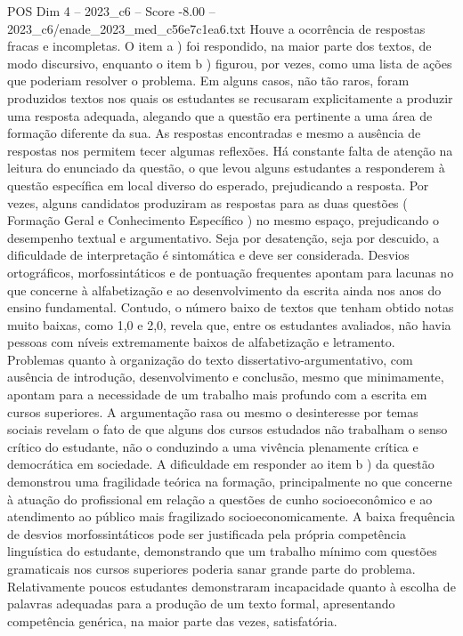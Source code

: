 \begin{textsample}{POS Dim 4 – 2023\_c6 – Score -8.00 – 2023\_c6/enade\_2023\_med\_c56e7c1ea6.txt}
Houve a ocorrência de respostas fracas e incompletas.
O item a ) foi respondido, na maior parte dos textos, de modo discursivo, enquanto o item b ) figurou, por vezes, como uma lista de ações que poderiam resolver o problema.
Em alguns casos, não tão raros, foram produzidos textos nos quais os estudantes se recusaram explicitamente a produzir uma resposta adequada, alegando que a questão era pertinente a uma área de formação diferente da sua.
As respostas encontradas e mesmo a ausência de respostas nos permitem tecer algumas reflexões.
Há constante falta de atenção na leitura do enunciado da questão, o que levou alguns estudantes a responderem à questão específica em local diverso do esperado, prejudicando a resposta.
Por vezes, alguns candidatos produziram as respostas para as duas questões ( Formação Geral e Conhecimento Específico ) no mesmo espaço, prejudicando o desempenho textual e argumentativo.
Seja por desatenção, seja por descuido, a dificuldade de interpretação é sintomática e deve ser considerada.
Desvios ortográficos, morfossintáticos e de pontuação frequentes apontam para lacunas no que concerne à alfabetização e ao desenvolvimento da escrita ainda nos anos do ensino fundamental.
Contudo, o número baixo de textos que tenham obtido notas muito baixas, como 1,0 e 2,0, revela que, entre os estudantes avaliados, não havia pessoas com níveis extremamente baixos de alfabetização e letramento.
Problemas quanto à organização do texto dissertativo-argumentativo, com ausência de introdução, desenvolvimento e conclusão, mesmo que minimamente, apontam para a necessidade de um trabalho mais profundo com a escrita em cursos superiores.
A argumentação rasa ou mesmo o desinteresse por temas sociais revelam o fato de que alguns dos cursos estudados não trabalham o senso crítico do estudante, não o conduzindo a uma vivência plenamente crítica e democrática em sociedade.
A dificuldade em responder ao item b ) da questão demonstrou uma fragilidade teórica na formação, principalmente no que concerne à atuação do profissional em relação a questões de cunho socioeconômico e ao atendimento ao público mais fragilizado socioeconomicamente.
A baixa frequência de desvios morfossintáticos pode ser justificada pela própria competência linguística do estudante, demonstrando que um trabalho mínimo com questões gramaticais nos cursos superiores poderia sanar grande parte do problema.
Relativamente poucos estudantes demonstraram incapacidade quanto à escolha de palavras adequadas para a produção de um texto formal, apresentando competência genérica, na maior parte das vezes, satisfatória.

\end{textsample}

